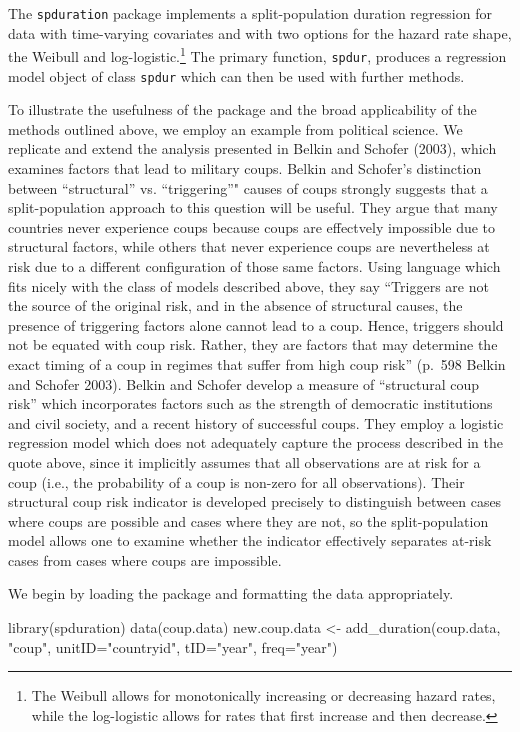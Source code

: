 \documentclass[article]{jss}
\begin{document}
The \texttt{spduration} package implements a split-population duration
regression for data with time-varying covariates and with two options
for the hazard rate shape, the Weibull and
log-logistic.\footnote{The Weibull allows for monotonically increasing or decreasing hazard rates, while the log-logistic allows for rates that first increase and then decrease.}
The primary function, \texttt{spdur}, produces a regression model object
of class \texttt{spdur} which can then be used with further methods.

To illustrate the usefulness of the package and the broad applicability
of the methods outlined above, we employ an example from political
science. We replicate and extend the analysis presented in Belkin and
Schofer (2003), which examines factors that lead to military coups.
Belkin and Schofer's distinction between ``structural'' vs.
``triggering''" causes of coups strongly suggests that a
split-population approach to this question will be useful. They argue
that many countries never experience coups because coups are effectvely
impossible due to structural factors, while others that never experience
coups are nevertheless at risk due to a different configuration of those
same factors. Using language which fits nicely with the class of models
described above, they say ``Triggers are not the source of the original
risk, and in the absence of structural causes, the presence of
triggering factors alone cannot lead to a coup. Hence, triggers should
not be equated with coup risk. Rather, they are factors that may
determine the exact timing of a coup in regimes that suffer from high
coup risk'' (p.~598 Belkin and Schofer 2003). Belkin and Schofer develop
a measure of ``structural coup risk'' which incorporates factors such as
the strength of democratic institutions and civil society, and a recent
history of successful coups. They employ a logistic regression model
which does not adequately capture the process described in the quote
above, since it implicitly assumes that all observations are at risk for
a coup (i.e., the probability of a coup is non-zero for all
observations). Their structural coup risk indicator is developed
precisely to distinguish between cases where coups are possible and
cases where they are not, so the split-population model allows one to
examine whether the indicator effectively separates at-risk cases from
cases where coups are impossible.

We begin by loading the package and formatting the data appropriately.

\begin{CodeChunk}
\begin{CodeInput}
library(spduration)
data(coup.data)
new.coup.data <- add_duration(coup.data, "coup", unitID="countryid", tID="year",
                              freq="year")
\end{CodeInput}
\end{CodeChunk}
\end{document}

